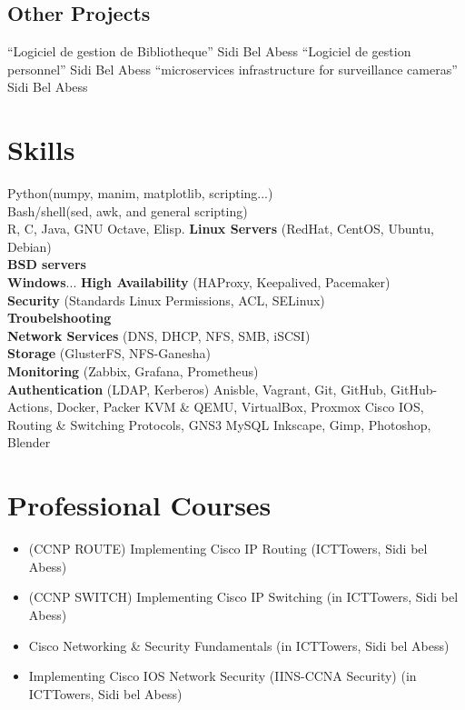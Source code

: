 \documentclass{cv}
\begin{document}
\subsection{Other Projects}

    {``Logiciel de gestion de Bibliotheque''}
	{Sidi Bel Abess}
	{}
    {``Logiciel de gestion personnel''}
	{Sidi Bel Abess}
	{}
    {``microservices infrastructure for surveillance cameras''}
	{Sidi Bel Abess}
	{}

\section{Skills}
    {\textnormal{Python(numpy, manim, matplotlib, scripting...)\\ 
    Bash/shell(sed, awk, and general scripting) \\
    R, C, Java, GNU Octave, Elisp.}}
	{}
	{}
    {\textbf{Linux Servers} \textnormal{(RedHat, CentOS, Ubuntu, Debian)}\\
    \textbf{BSD servers}\\
    \textbf{Windows}...}
	{}
	{}
      {\textbf{High Availability} \textnormal{(HAProxy, Keepalived, Pacemaker)}\\
      \textbf{Security} \textnormal{(Standards Linux Permissions, ACL, SELinux)}\\
      \textbf{Troubelshooting}\\
      \textbf{Network Services} \textnormal{(DNS, DHCP, NFS, SMB, iSCSI)}\\
      \textbf{Storage} \textnormal{(GlusterFS, NFS-Ganesha)}\\ 
      \textbf{Monitoring} \textnormal{(Zabbix, Grafana, Prometheus)}\\ 
      \textbf{Authentication} \textnormal{(LDAP, Kerberos)}} 
	{}
	{}
	{Anisble, Vagrant, Git, GitHub, GitHub-Actions, Docker, Packer}
	{}
	{}
    {KVM \& QEMU, VirtualBox, Proxmox}
	{}
	{}
    {Cisco IOS, Routing \& Switching Protocols, GNS3}
	{}
	{}
	{MySQL}
	{}
	{}
	{Inkscape, Gimp, Photoshop, Blender}
	{}

\section{Professional Courses}
\begin{itemize}
  \item (CCNP ROUTE) Implementing Cisco IP Routing (ICTTowers, Sidi bel Abess)
\item (CCNP SWITCH) Implementing Cisco IP Switching  (in ICTTowers, Sidi bel Abess)
\item Cisco Networking \& Security Fundamentals (in ICTTowers, Sidi bel Abess)
\item Implementing Cisco IOS Network Security (IINS-CCNA Security) (in ICTTowers, Sidi bel Abess)
\end{itemize}
\end{document}
